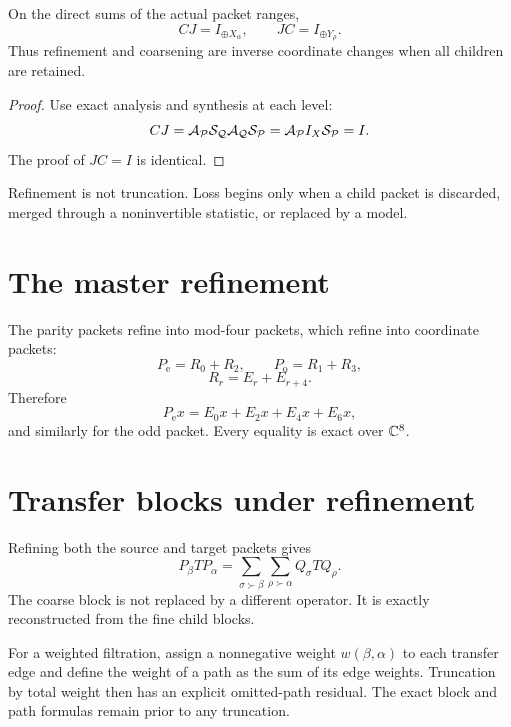 \begin{theorem}\label{thm:coordinate-refinement}
On the direct sums of the actual packet ranges,
\[
\boxed{CJ=I_{\oplus X_\alpha},\qquad JC=I_{\oplus Y_\rho}.}
\]
Thus refinement and coarsening are inverse coordinate changes when all children are retained.
\end{theorem}

\begin{proof}
Use exact analysis and synthesis at each level:
\[
CJ
=
\mathcal A_{\mathcal P}\mathcal S_{\mathcal Q}
\mathcal A_{\mathcal Q}\mathcal S_{\mathcal P}
=
\mathcal A_{\mathcal P}I_X\mathcal S_{\mathcal P}
=I.
\]
The proof of $JC=I$ is identical.
\end{proof}

\begin{remark}
Refinement is not truncation.  Loss begins only when a child packet is discarded, merged through a noninvertible statistic, or replaced by a model.
\end{remark}


\section{The master refinement}
The parity packets refine into mod-four packets, which refine into coordinate packets:
\[
P_{\mathrm e}=R_0+R_2,
\qquad
P_{\mathrm o}=R_1+R_3,
\]
\[
R_r=E_r+E_{r+4}.
\]
Therefore
\[
P_{\mathrm e}x
=
E_0x+E_2x+E_4x+E_6x,
\]
and similarly for the odd packet.  Every equality is exact over $\mathbb C^8$.

\section{Transfer blocks under refinement}
Refining both the source and target packets gives
\[
P_\beta TP_\alpha
=
\sum_{\sigma\succ\beta}
\sum_{\rho\succ\alpha}
Q_\sigma TQ_\rho.
\]
The coarse block is not replaced by a different operator.  It is exactly reconstructed from the fine child blocks.

For a weighted filtration, assign a nonnegative weight $w(\beta,\alpha)$ to each transfer edge and define the weight of a path as the sum of its edge weights.  Truncation by total weight then has an explicit omitted-path residual.  The exact block and path formulas remain prior to any truncation.

